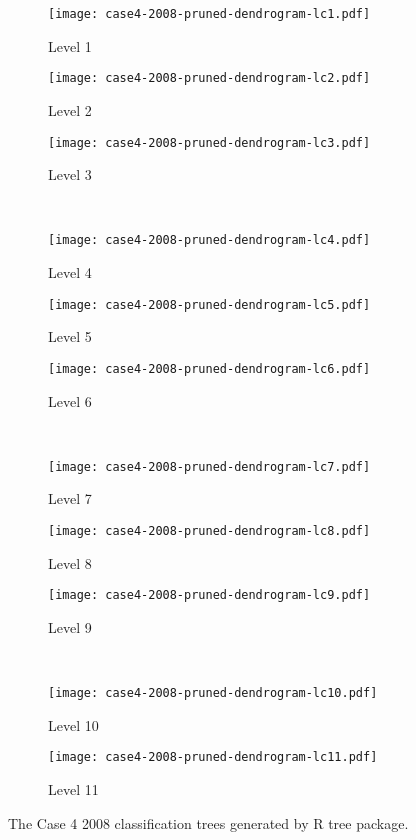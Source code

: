 \begin{appendices}

\begin{figure}[!ht] \centering
	\captionsetup[subfigure]{width=2.0in}
	\begin{subfigure}[t]{0.32\textwidth}
		\texttt{[image: case4-2008-pruned-dendrogram-lc1.pdf]}
		\caption{Level 1}
	\end{subfigure}
	\begin{subfigure}[t]{0.32\textwidth}
		\texttt{[image: case4-2008-pruned-dendrogram-lc2.pdf]}
		\caption{Level 2}
	\end{subfigure}
	\begin{subfigure}[t]{0.32\textwidth}
		\texttt{[image: case4-2008-pruned-dendrogram-lc3.pdf]}
		\caption{Level 3}
	\end{subfigure}\\
	\vspace{5pt}
	\begin{subfigure}[t]{0.32\textwidth}
		\texttt{[image: case4-2008-pruned-dendrogram-lc4.pdf]}
		\caption{Level 4}
	\end{subfigure}
	\begin{subfigure}[t]{0.32\textwidth}
		\texttt{[image: case4-2008-pruned-dendrogram-lc5.pdf]}
		\caption{Level 5}
	\end{subfigure}
	\begin{subfigure}[t]{0.32\textwidth}
		\texttt{[image: case4-2008-pruned-dendrogram-lc6.pdf]}
		\caption{Level 6}
	\end{subfigure}\\
	\vspace{5pt}	
	\begin{subfigure}[t]{0.32\textwidth}
		\texttt{[image: case4-2008-pruned-dendrogram-lc7.pdf]}
		\caption{Level 7}
	\end{subfigure}
	\begin{subfigure}[t]{0.32\textwidth}
		\texttt{[image: case4-2008-pruned-dendrogram-lc8.pdf]}
		\caption{Level 8}
	\end{subfigure}
	\begin{subfigure}[t]{0.32\textwidth}
		\texttt{[image: case4-2008-pruned-dendrogram-lc9.pdf]}
		\caption{Level 9}
	\end{subfigure}\\
	\vspace{5pt}
	\begin{subfigure}[t]{0.32\textwidth}
		\texttt{[image: case4-2008-pruned-dendrogram-lc10.pdf]}
		\caption{Level 10}
	\end{subfigure}
	\begin{subfigure}[t]{0.32\textwidth}
		\texttt{[image: case4-2008-pruned-dendrogram-lc11.pdf]}
		\caption{Level 11}
	\end{subfigure}
	\vspace{5pt}
	\caption[The Case 4 2008 classification trees generated by R tree package.]{The Case 4 2008 classification trees generated by R tree package.}
	\label{fig: appendix-fig.c27.tree}
\end{figure}


\end{appendices}
